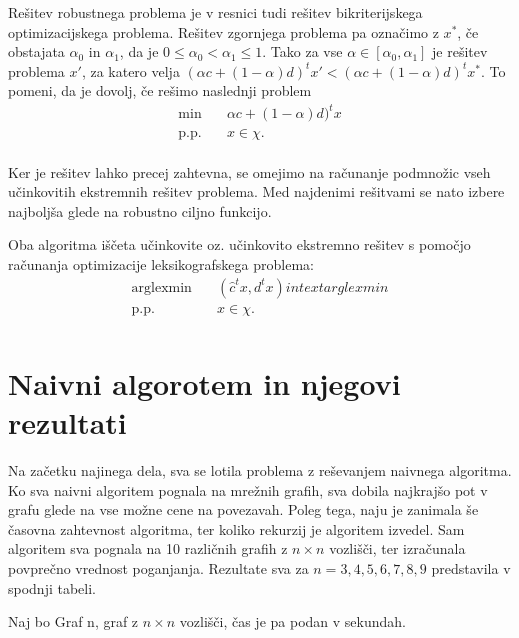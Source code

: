 \documentclass[a4paper, 12 pt]{article}
\theoremstyle{definition} %
\theoremstyle{plain} %
\theoremstyle{definition}
\begin{document}
Rešitev robustnega problema je v resnici tudi rešitev bikriterijskega optimizacijskega problema. Rešitev zgornjega problema pa označimo z $x^*$, če obstajata  $\alpha_{0}$ in $\alpha_{1}$, da je $0 \le \alpha_{0} < \alpha_{1} \le 1$. Tako za vse $\alpha \in [\alpha_{0},\alpha_{1}]$ je rešitev problema $x'$, za katero velja $(\alpha c + (1 - \alpha)d)^tx' < (\alpha c + (1- \alpha)d)^tx^{*}$.\newline
 To pomeni, da je dovolj, če rešimo naslednji problem
\begin{equation*}
\begin{aligned}
\min \quad &  \alpha c + (1 - \alpha)d)^tx \\
\textrm{p.p.} \quad & x \in \chi.\\
\end{aligned}
\end{equation*}

Ker je rešitev lahko precej zahtevna, se omejimo na računanje podmnožic vseh učinkovitih ekstremnih rešitev problema. Med najdenimi rešitvami se nato izbere najboljša glede na robustno ciljno funkcijo.


Oba algoritma iščeta učinkovite oz. učinkovito ekstremno rešitev s pomočjo računanja optimizacije leksikografskega problema:
\begin{equation*}
\begin{aligned}
\text{arglexmin}\quad &  (\hat{c}^t x , {d^tx}) in text{arglexmin}\\
\textrm{p.p.} \quad & x \in \chi.\\
\end{aligned}
\end{equation*}

\section{Naivni algorotem in njegovi rezultati}

Na začetku najinega dela, sva se lotila problema z reševanjem naivnega algoritma. Ko sva naivni algoritem pognala na mrežnih grafih, sva dobila najkrajšo pot v grafu glede na vse možne cene na povezavah. Poleg tega, naju je zanimala še časovna zahtevnost algoritma, ter koliko rekurzij je algoritem izvedel.
Sam algoritem sva pognala na 10 različnih grafih z $n \times n$ vozlišči, ter izračunala povprečno vrednost poganjanja. Rezultate sva za $n = 3, 4, 5, 6, 7, 8, 9$ predstavila v spodnji tabeli.\newline


Naj bo Graf n, graf z $n \times n$ vozlišči, čas je pa podan v sekundah.
\end{document}
